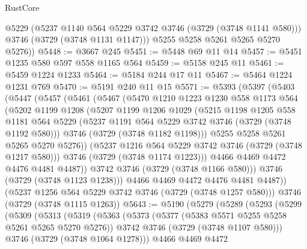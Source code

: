 \begin{lexlean}{RustCore}
\begin{coremodule}
          @5229
          (@5237 @1140 @564 @5229 @3742 @3746 (@3729 (@3748 @1141 @580)))
          @3746
          (@3729 (@3748 @1131 @1147)))
        @5255
        @5258
        @5261
        @5265
        @5270
        @5276))
@5448 := @3667 @245
@5451 := @5448 @69 @11 @14
@5457 := @5451 @1235 @580 @597 @558 @1165 @564
@5459 := @5158 @245 @11
@5461 := @5459 @1224 @1233
@5464 := @5184 @244 @17 @11
@5467 := @5464 @1224 @1231 @769
@5470 := @5191 @240 @11 @15
@5571 := @5393
    (@5397
      (@5403
        (@5447
          (@5457
            (@5461
              (@5467
                (@5470
                  @1210
                  @1223
                  @1230
                  @558
                  @1173
                  @564
                  (@5202
                    @1199
                    @1208
                    (@5207
                      @1199
                      @1206
                      @1029
                      (@5215
                        @1198
                        @1205
                        @558
                        @1181
                        @564
                        @5229
                        (@5237 @1191 @564 @5229 @3742 @3746 (@3729 (@3748 @1192 @580)))
                        @3746
                        (@3729 (@3748 @1182 @1198)))
                      @5255
                      @5258
                      @5261
                      @5265
                      @5270
                      @5276))
                  (@5237 @1216 @564 @5229 @3742 @3746 (@3729 (@3748 @1217 @580)))
                  @3746
                  (@3729 (@3748 @1174 @1223)))
                @4466
                @4469
                @4472
                @4476
                @4481
                @4487))
            @3742
            @3746
            (@3729 (@3748 @1166 @580)))
          @3746
          (@3729 (@3748 @1123 @1238)))
        @4466
        @4469
        @4472
        @4476
        @4481
        @4487))
    (@5237 @1256 @564 @5229 @3742 @3746 (@3729 (@3748 @1257 @580)))
    @3746
    (@3729 (@3748 @1115 @1263))
@5643 := @5190
    (@5279
      (@5289
        (@5293
          (@5299
            (@5309
              (@5313
                (@5319
                  (@5363
                    (@5373
                      (@5377 (@5383 @5571 @5255 @5258 @5261 @5265 @5270 @5276))
                      @3742
                      @3746
                      (@3729 (@3748 @1107 @580)))
                    @3746
                    (@3729 (@3748 @1064 @1278)))
                  @4466
                  @4469
                  @4472

\end{coremodule}
\end{lexlean}
